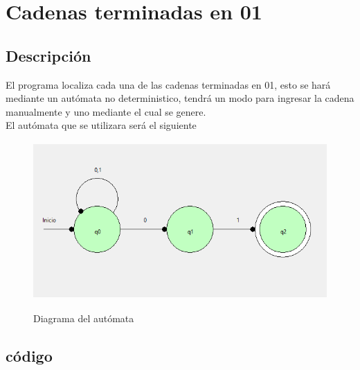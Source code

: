\documentclass[12pt,letterpaper]{article}
\begin{document}
\section{Cadenas terminadas en 01}
\subsection{Descripci\'on}
El programa localiza cada una de las cadenas terminadas en 01, esto se har\'a mediante un aut\'omata no deterministico, tendr\'a un modo para ingresar la cadena manualmente y uno mediante el cual se genere.\\
El aut\'omata que se utilizara ser\'a el siguiente\\
\begin{figure}[H]
\includegraphics[width=\textwidth, height=6cm]{AND.png}
\label{fig:AND}
\caption{Diagrama del aut\'omata}
\end{figure}

\subsection{c\'odigo}
\end{document}
